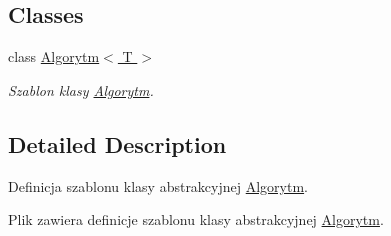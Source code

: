 \subsection*{Classes}
\begin{DoxyCompactItemize}
\item 
class \hyperlink{a00001}{Algorytm$<$ T $>$}
\begin{DoxyCompactList}\small\item\em Szablon klasy \hyperlink{a00001}{Algorytm}. \end{DoxyCompactList}\end{DoxyCompactItemize}


\subsection{Detailed Description}
Definicja szablonu klasy abstrakcyjnej \hyperlink{a00001}{Algorytm}. 

Plik zawiera definicje szablonu klasy abstrakcyjnej \hyperlink{a00001}{Algorytm}. 